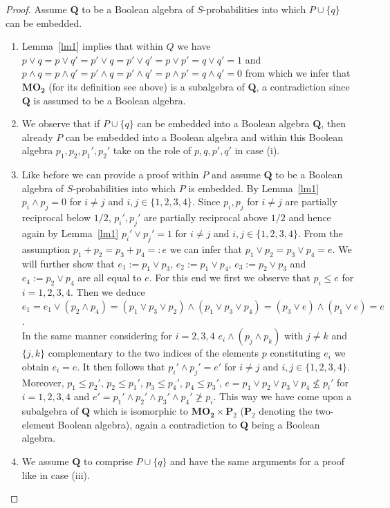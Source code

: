 \documentclass[12pt]{article}
\begin{document}
\begin{proof}
Assume $\mathbf Q$ to be a Boolean algebra of $S$-probabilities into which $P\cup\{q\}$ can be embedded.
\begin{enumerate}
\item[(i)] Lemma~\ref{lm1} implies that within $Q$ we have $p\vee q=p\vee q'=p'\vee q=p'\vee q'=p\vee p'=q\vee q'=1$ and $p\wedge q=p\wedge q'=p'\wedge q=p'\wedge q'=p\wedge p'=q\wedge q'=0$ from which we infer that $\mathbf{MO_2}$ (for its definition see above) is a subalgebra of $\mathbf Q$, a contradiction since $\mathbf Q$ is assumed to be a Boolean algebra.
\item[(ii)] We observe that if $P\cup\{q\}$ can be embedded into a Boolean algebra $\mathbf Q$, then already $P$ can be embedded into a Boolean algebra and within this Boolean algebra $p_1,p_2,p_1',p_2'$ take on the role of $p,q,p',q'$ in case (i).
\item[(iii)] Like before we can provide a proof within $P$ and assume $\mathbf Q$ to be a Boolean algebra of $S$-probabilities into which $P$ is embedded. By Lemma~\ref{lm1} $p_i\wedge p_j=0$ for $i\ne j$ and $i,j\in\{1,2,3,4\}$. Since $p_i,p_j$ for $i\ne j$ are partially reciprocal below $1/2$, $p_i',p_j'$ are partially reciprocal above $1/2$ and hence again by Lemma~\ref{lm1} $p_i'\vee p_j'=1$ for $i\ne j$ and $i,j\in\{1,2,3,4\}$. From the assumption $p_1+p_2=p_3+p_4=:e$ we can infer that $p_1\vee p_2=p_3\vee p_4=e$. We will further show that $e_1:=p_1\vee p_3$, $e_2:=p_1\vee p_4$, $e_3:=p_2\vee p_3$ and $e_4:=p_2\vee p_4$ are all equal to $e$. For this end we first we observe that $p_i\le e$ for $i=1,2,3,4$. Then we deduce
$e_1=e_1\vee(p_2\wedge p_4)=(p_1\vee p_3\vee p_2)\wedge(p_1\vee p_3\vee p_4)=(p_3\vee e)\wedge(p_1\vee e)=e$. \\
In the same manner considering for $i=2,3,4$ $e_i\wedge(p_j\wedge p_k)$ with $j\ne k$ and $\{j,k\}$ complementary to the two indices of the elements $p$ constituting $e_i$ we obtain $e_i=e$. It then follows that $p_i'\wedge p_j'=e'$ for $i\ne j$ and $i,j\in\{1,2,3,4\}$. Moreover, $p_1\leq p_2'$, $p_2\leq p_1'$, $p_3\leq p_4'$, $p_4\leq p_3'$, $e=p_1\vee p_2\vee p_3\vee p_4 \nleq p_i'$ for $i=1,2,3,4$ and $e'=p_1'\wedge p_2'\wedge p_3'\wedge p_4'\ngeq p_i$. This way we have come upon a subalgebra of $\mathbf Q$ which is isomorphic to $\mathbf{MO_2}\times\mathbf P_2$ ($\mathbf P_2$ denoting the two-element Boolean algebra), again a contradiction to $\mathbf Q$ being a Boolean algebra.
\item[(iv)] We assume $\mathbf Q$ to comprise $P\cup\{q\}$ and have the same arguments for a proof like in case (iii).
\end{enumerate}
\end{proof}
\end{document}
